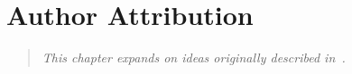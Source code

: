 \chapter{Author Attribution}
\label{ch:diff}
\begin{quote}
\textit{This chapter expands on ideas originally described in~\cite{Adler2007}.}
\end{quote}






